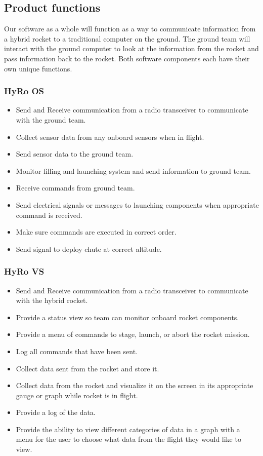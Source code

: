 \documentclass[10pt,draftclsnofoot,onecolumn,compsoc]{IEEEtran}
\begin{document}
\subsection{ Product functions}
Our software as a whole will function as a way to communicate information from a hybrid rocket to a traditional computer on the ground. The ground team will interact with the ground computer to look at the information from the rocket and pass information back to the rocket. Both software components each have their own unique functions.
\subsubsection{HyRo OS}
\begin{itemize}
\item Send and Receive communication from a radio transceiver to communicate with the ground team.
\item Collect sensor data from any onboard sensors when in flight.
\item Send sensor data to the ground team.
\item Monitor filling and launching system and send information to ground team.
\item Receive commands from ground team.
\item Send electrical signals or messages to launching components when appropriate command is received.
\item Make sure commands are executed in correct order.
\item Send signal to deploy chute at correct altitude.
\end{itemize}

\subsubsection{HyRo VS}
\begin{itemize}
\item Send and Receive communication from a radio transceiver to communicate with the hybrid rocket.
\item Provide a status view so team can monitor onboard rocket components.
\item Provide a menu of commands to stage, launch, or abort the rocket mission.
\item Log all commands that have been sent.
\item Collect data sent from the rocket and store it.
\item Collect data from the rocket and visualize it on the screen in its appropriate gauge or graph while rocket is in flight.
\item Provide a log of the data.
\item Provide the ability to view different categories of data in a graph with a menu for the user to choose what data from the flight they would like to view.\end{itemize}
\end{document}
